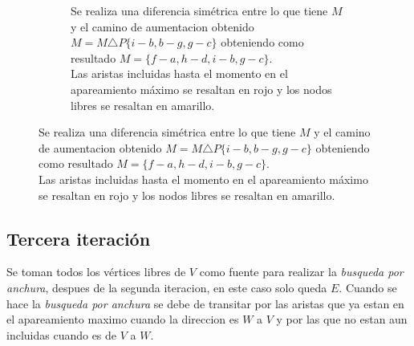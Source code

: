 \documentclass[12pt,a4paper]{article}
\begin{document}
\begin{center}
\begin{figure}[!htb]
\begin{minipage}{.45\linewidth}
\begin{subfigure}[t]{.9\linewidth}
	\captionsetup{belowskip=0pt}
                \captionsetup{justification=centering}
    		\caption{\footnotesize Se realiza una diferencia simétrica entre lo que tiene $M$ y el camino de aumentacion obtenido $M=M \triangle P\{i-b,b-g,g-c\}$ obteniendo como resultado $M=\{f-a,h-d,i-b,g-c\}$.\\Las aristas incluidas hasta el momento en el apareamiento máximo se resaltan en rojo y los nodos libres se resaltan en amarillo.}
                \label{fig:weather_activity}
            \end{subfigure}
        \end{minipage}
\end{figure}
\end{center}

\subsection{Tercera iteración} \noindent
Se toman todos los vértices libres de $V$ como fuente para realizar la \textit{busqueda por anchura}, despues de la segunda iteracion, en este caso solo queda $E$. Cuando se hace la \textit{busqueda por anchura} se debe de transitar por las aristas que ya estan en el apareamiento maximo cuando la direccion es $W$ a $V$ y por las que no estan aun incluidas cuando es de $V$ a $W$. 
\end{document}
